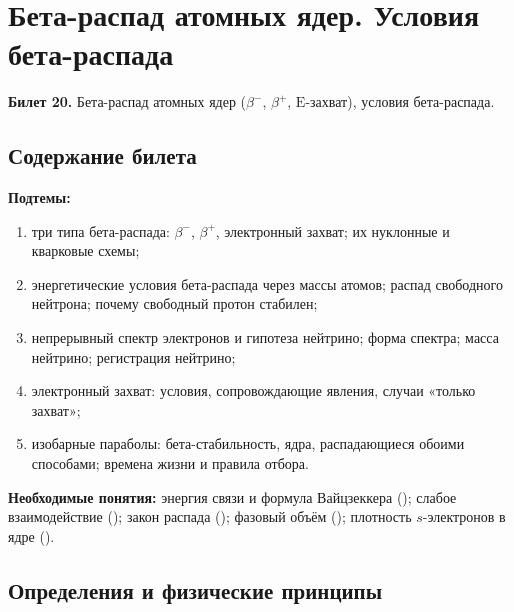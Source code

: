 \chapter[Бета-распад ядер. Условия бета-распада]%
        {Бета-распад атомных ядер. Условия бета-распада}
\label{t:20}

\begin{qbox}
\textbf{Билет 20.} Бета-распад атомных ядер ($\beta^-$, $\beta^+$, $\mathrm E$-захват), условия бета-распада.
\end{qbox}


\section{Содержание билета}

\textbf{Подтемы:}
\begin{enumerate}
 \item три типа бета-распада: $\beta^-$, $\beta^+$, электронный захват; их нуклонные и кварковые схемы;
 \item энергетические условия бета-распада через массы атомов; распад свободного нейтрона; почему свободный протон стабилен;
 \item непрерывный спектр электронов и гипотеза нейтрино; форма спектра; масса нейтрино; регистрация нейтрино;
 \item электронный захват: условия, сопровождающие явления, случаи «только захват»;
 \item изобарные параболы: бета-стабильность, ядра, распадающиеся обоими способами; времена жизни и правила отбора.
\end{enumerate}

\textbf{Необходимые понятия:} энергия связи и формула Вайцзеккера (); слабое взаимодействие ();
закон распада (); фазовый объём (); плотность $s$-электронов в ядре ().

\section{Определения и физические принципы}

